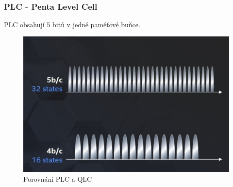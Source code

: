 \subsubsection{PLC - Penta Level Cell}
PLC obsahují 5 bitů v jedné paměťové buňce.
    \begin{figure}[h]
   \begin{center}
     \includegraphics[scale=0.4]{images/PLC.png}
   \end{center}
   \caption{Porovnání PLC a QLC}
  \end{figure}
\newpage
